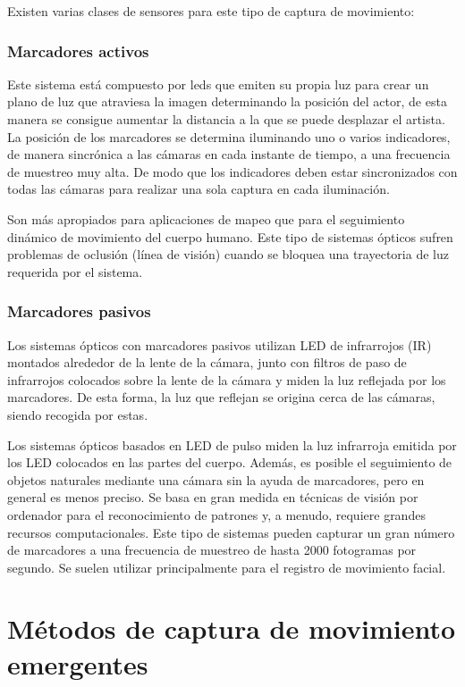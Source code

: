 Existen varias clases de sensores para este tipo de captura de movimiento:

\subsubsection{Marcadores activos}

Este sistema está compuesto por leds que emiten su propia luz para crear un plano de luz que atraviesa la imagen determinando la posición del actor, de esta manera se consigue aumentar la distancia a la que se puede desplazar el artista. La posición de los marcadores se determina iluminando uno o varios indicadores, de manera sincrónica a las cámaras en cada instante de tiempo, a una frecuencia de muestreo muy alta. De modo que los indicadores deben estar sincronizados con todas las cámaras para realizar una sola captura en cada iluminación. 

Son más apropiados para aplicaciones de mapeo que para el seguimiento dinámico de movimiento del cuerpo humano. Este tipo de sistemas ópticos sufren problemas de oclusión (línea de visión) cuando se bloquea una trayectoria de luz requerida por el sistema.

\subsubsection{Marcadores pasivos}

Los sistemas ópticos con marcadores pasivos utilizan LED de infrarrojos (IR) montados alrededor de la lente de la cámara, junto con filtros de paso de infrarrojos colocados sobre la lente de la cámara y miden la luz reflejada por los marcadores. De esta forma, la luz que reflejan se origina cerca de las cámaras, siendo recogida por estas. 

Los sistemas ópticos basados en LED de pulso miden la luz infrarroja emitida por los LED colocados en las partes del cuerpo. Además, es posible el seguimiento de objetos naturales mediante una cámara sin la ayuda de marcadores, pero en general es menos preciso. Se basa en gran medida en técnicas de visión por ordenador para el reconocimiento de patrones y, a menudo, requiere grandes recursos computacionales. Este tipo de sistemas pueden capturar un gran número de marcadores a una frecuencia de muestreo de hasta 2000 fotogramas por segundo. Se suelen utilizar principalmente para el registro de movimiento facial. 

\section{Métodos de captura de movimiento emergentes}

